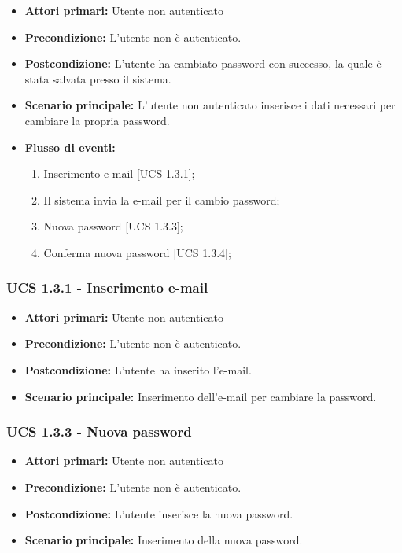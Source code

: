 \begin{itemize}
\item \textbf{Attori primari:} Utente non autenticato
\item \textbf{Precondizione:}  L'utente non è autenticato.
\item \textbf{Postcondizione:} L'utente ha cambiato password con successo, la quale è stata salvata presso il sistema.
\item \textbf{Scenario principale:} L'utente non autenticato inserisce i dati necessari per cambiare la propria password.
\item \textbf{Flusso di eventi:}
    \begin{enumerate}
        \item Inserimento e-mail [UCS 1.3.1];
        \item Il sistema invia la e-mail per il cambio password;
        \item Nuova password [UCS 1.3.3];
        \item Conferma nuova password [UCS 1.3.4];
    \end{enumerate}
\end{itemize}

\subsubsection{UCS 1.3.1 - Inserimento e-mail}
\begin{itemize}
\item \textbf{Attori primari:} Utente non autenticato
\item \textbf{Precondizione:} L'utente non è autenticato. %
\item \textbf{Postcondizione:} L'utente ha inserito l'e-mail.
\item \textbf{Scenario principale:} Inserimento dell'e-mail per cambiare la password.
\end{itemize}

\subsubsection{UCS 1.3.3 - Nuova password}
\begin{itemize}
\item \textbf{Attori primari:} Utente non autenticato
\item \textbf{Precondizione:}  L'utente non è autenticato.
\item \textbf{Postcondizione:} L'utente inserisce la nuova password.
\item \textbf{Scenario principale:} Inserimento della nuova password.
\end{itemize}

